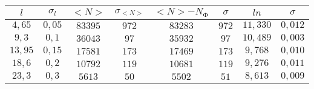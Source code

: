 \begin{tabular}{| c | c | c | c | c | c | c | c |}
\hline
$l$ & $\sigma_l$ & $<N>$ & $\sigma_{<N>}$ & $<N>-N_Ф$ & $\sigma$ & $ln$ & $\sigma$\\
\hline
$4,65$ & $0,05$ & $83395$ & $972$ & $83283$ & $972$ & $11,330$ & $0,012$\\
\hline
$9,3$ & $0,1$ & $36043$ & $97$ & $35932$ & $97$ & $10,489$ & $0,003$\\
\hline
$13,95$ & $0,15$ & $17581$ & $173$ & $17469$ & $173$ & $9,768$ & $0,010$\\
\hline
$18,6$ & $0,2$ & $10792$ & $119$ & $10681$ & $119$ & $9,276$ & $0,011$\\
\hline
$23,3$ & $0,3$ & $5613$ & $50$ & $5502$ & $51$ & $8,613$ & $0,009$\\
\hline
\end{tabular}
